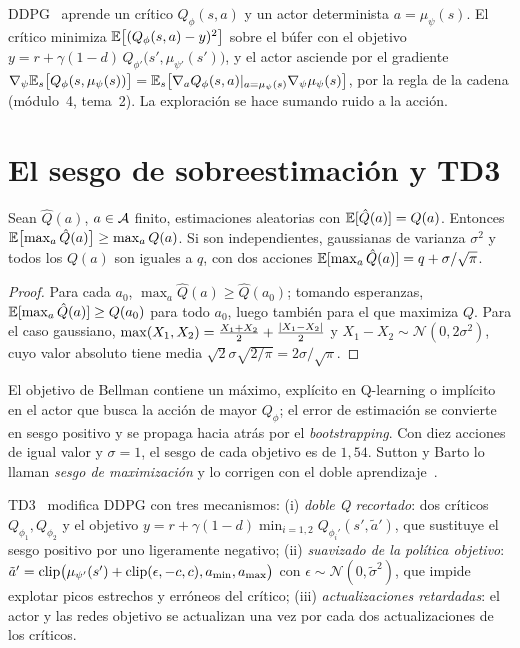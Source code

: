 \begin{definicion}[DDPG]\label{def:ddpg}
DDPG~\cite{ddpg} aprende un crítico $Q_\phi(s,a)$ y un actor determinista $a=\mu_\psi(s)$. El crítico minimiza $\mathbb{E}\bigl[(Q_\phi(s,a)-y)^{2}\bigr]$ sobre el búfer con el objetivo $y=r+\gamma(1-d)\,Q_{\phi'}\bigl(s',\mu_{\psi'}(s')\bigr)$, y el actor asciende por el gradiente $\nabla_\psi\mathbb{E}_s\bigl[Q_\phi(s,\mu_\psi(s))\bigr]=\mathbb{E}_s\bigl[\nabla_aQ_\phi(s,a)\rvert_{a=\mu_\psi(s)}\nabla_\psi\mu_\psi(s)\bigr]$, por la regla de la cadena (módulo~4, tema~2). La exploración se hace sumando ruido a la acción.
\end{definicion}

\section{El sesgo de sobreestimación y TD3}

\begin{proposicion}\label{prop:sobre}
Sean $\hat Q(a)$, $a\in\mathcal{A}$ finito, estimaciones aleatorias con $\mathbb{E}[\hat Q(a)]=Q(a)$. Entonces $\mathbb{E}\bigl[\max_a\hat Q(a)\bigr]\ge\max_aQ(a)$. Si son independientes, gaussianas de varianza $\sigma^{2}$ y todos los $Q(a)$ son iguales a $q$, con dos acciones $\mathbb{E}[\max_a\hat Q(a)]=q+\sigma/\sqrt\pi$.
\end{proposicion}

\begin{proof}
Para cada $a_0$, $\max_a\hat Q(a)\ge\hat Q(a_0)$; tomando esperanzas, $\mathbb{E}[\max_a\hat Q(a)]\ge Q(a_0)$ para todo $a_0$, luego también para el que maximiza $Q$. Para el caso gaussiano, $\max(X_1,X_2)=\frac{X_1+X_2}{2}+\frac{\lvert X_1-X_2\rvert}{2}$ y $X_1-X_2\sim\mathcal N(0,2\sigma^{2})$, cuyo valor absoluto tiene media $\sqrt2\sigma\sqrt{2/\pi}=2\sigma/\sqrt\pi$.
\end{proof}

El objetivo de Bellman contiene un máximo, explícito en Q-learning o implícito en el actor que busca la acción de mayor $Q_\phi$; el error de estimación se convierte en sesgo positivo y se propaga hacia atrás por el \emph{bootstrapping}. Con diez acciones de igual valor y $\sigma=1$, el sesgo de cada objetivo es de $1{,}54$. Sutton y Barto lo llaman \emph{sesgo de maximización} y lo corrigen con el doble aprendizaje~\cite[§6.7]{sb}.

\begin{definicion}[TD3]\label{def:td3}
TD3~\cite{td3} modifica DDPG con tres mecanismos: (i) \emph{doble Q recortado}: dos críticos $Q_{\phi_1},Q_{\phi_2}$ y el objetivo $y=r+\gamma(1-d)\min_{i=1,2}Q_{\phi_i'}(s',\tilde a')$, que sustituye el sesgo positivo por uno ligeramente negativo; (ii) \emph{suavizado de la política objetivo}: $\tilde a'=\operatorname{clip}\bigl(\mu_{\psi'}(s')+\operatorname{clip}(\epsilon,-c,c),a_{\min},a_{\max}\bigr)$ con $\epsilon\sim\mathcal N(0,\tilde\sigma^{2})$, que impide explotar picos estrechos y erróneos del crítico; (iii) \emph{actualizaciones retardadas}: el actor y las redes objetivo se actualizan una vez por cada dos actualizaciones de los críticos.
\end{definicion}

